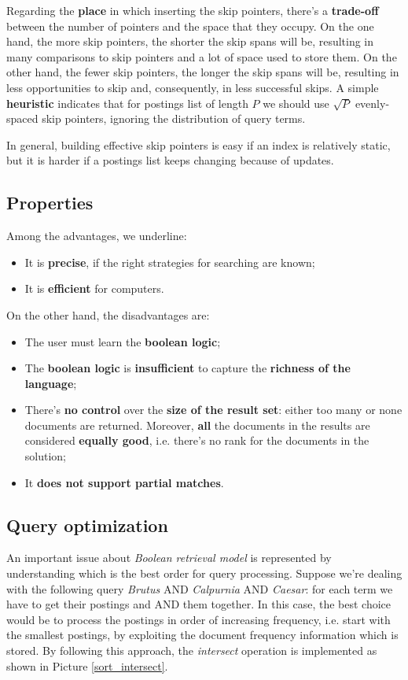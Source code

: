 Regarding the \textbf{place} in which inserting the skip pointers, there's a \textbf{trade-off} between the number of pointers and the space that they occupy. On the one hand, the more skip pointers, the shorter the skip spans will be, resulting in many comparisons to skip pointers and a lot of space used to store them. On the other hand, the fewer skip pointers, the longer the skip spans will be, resulting in less opportunities to skip and, consequently, in less successful skips. A simple \textbf{heuristic} indicates that for postings list of length $P$ we should use $\sqrt{P}$ evenly-spaced skip pointers, ignoring the distribution of query terms.

In general, building effective skip pointers is easy if an index is relatively static, but it is harder if a postings list keeps changing because of updates.

\subsection{Properties}
Among the advantages, we underline:

\begin{itemize}
    \item It is \textbf{precise}, if the right strategies for searching are known;
    \item It is \textbf{efficient} for computers.
\end{itemize}

On the other hand, the disadvantages are:

\begin{itemize}
    \item The user must learn the \textbf{boolean logic};
    \item The \textbf{boolean logic} is \textbf{insufficient} to capture the \textbf{richness of the language};
    \item There's \textbf{no control} over the \textbf{size of the result set}: either too many or none documents are returned. Moreover, \textbf{all} the documents in the results are considered \textbf{equally good}, i.e. there's no rank for the documents in the solution;
    \item It \textbf{does not support partial matches}.
\end{itemize}

\subsection{Query optimization}
An important issue about \textit{Boolean retrieval model} is represented by understanding which is the best order for query processing. Suppose we're dealing with the following query \textit{Brutus} AND \textit{Calpurnia} AND \textit{Caesar}: for each term we have to get their postings and AND them together. In this case, the best choice would be to process the postings in order of increasing frequency, i.e. start with the smallest postings, by exploiting the document frequency information which is stored. By following this approach, the \textit{intersect} operation is implemented as shown in Picture \ref{sort_intersect}.

